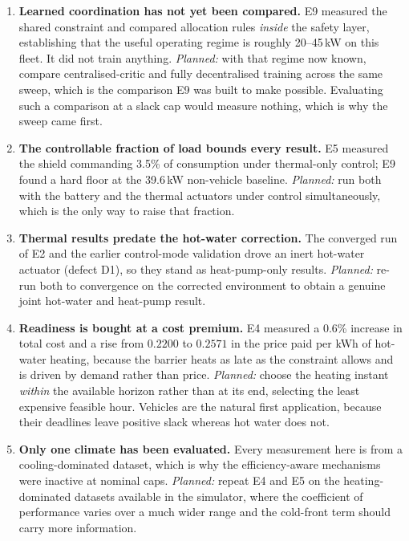 \documentclass[11pt]{article}
\begin{document}
\begin{enumerate}
\item \textbf{Learned coordination has not yet been compared.} E9 measured the
shared constraint and compared allocation rules \emph{inside} the safety layer,
establishing that the useful operating regime is roughly 20--45\,kW on this
fleet. It did not train anything. \emph{Planned:} with that regime now known,
compare centralised-critic and fully decentralised training across the same
sweep, which is the comparison E9 was built to make possible. Evaluating such a
comparison at a slack cap would measure nothing, which is why the sweep came
first.

\item \textbf{The controllable fraction of load bounds every result.} E5 measured
the shield commanding 3.5\% of consumption under thermal-only control; E9 found
a hard floor at the 39.6\,kW non-vehicle baseline. \emph{Planned:} run both with
the battery and the thermal actuators under control simultaneously, which is the
only way to raise that fraction.

\item \textbf{Thermal results predate the hot-water correction.} The converged
run of E2 and the earlier control-mode validation drove an inert hot-water
actuator (defect D1), so they stand as heat-pump-only results. \emph{Planned:}
re-run both to convergence on the corrected environment to obtain a genuine joint
hot-water and heat-pump result.

\item \textbf{Readiness is bought at a cost premium.} E4 measured a 0.6\%
increase in total cost and a rise from $0.2200$ to $0.2571$ in the price paid per
kWh of hot-water heating, because the barrier heats as late as the constraint
allows and is driven by demand rather than price. \emph{Planned:} choose the
heating instant \emph{within} the available horizon rather than at its end,
selecting the least expensive feasible hour. Vehicles are the natural first
application, because their deadlines leave positive slack whereas hot water does
not.

\item \textbf{Only one climate has been evaluated.} Every measurement here is
from a cooling-dominated dataset, which is why the efficiency-aware mechanisms
were inactive at nominal caps. \emph{Planned:} repeat E4 and E5 on the
heating-dominated datasets available in the simulator, where the coefficient of
performance varies over a much wider range and the cold-front term should carry
more information.


\end{enumerate}
\end{document}
